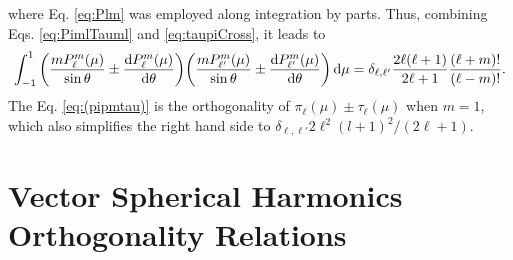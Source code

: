 %
where Eq. \eqref{eq:Plm} was employed along integration by parts. Thus, combining Eqs. \eqref{eq:PimlTauml} and \eqref{eq:taupiCross}, it leads to
%
\begin{align}
\int_{-1}^{1}\qty(\frac{mP_\ell^m(\mu)}{\sin\theta}\pm\dv{P_\ell^m(\mu)}{\theta})\qty(\frac{mP_{\ell'}^m(\mu)}{\sin\theta}\pm\dv{P_{\ell'}^m(\mu)}{\theta})\dd{\mu}
 =  \delta_{\ell,\ell'}\frac{2\ell(\ell+1)}{2\ell+1}\frac{(\ell+m)!}{(\ell-m)!}.
 \label{eq:(pipmtau)}
\end{align}
%
The Eq. \eqref{eq:(pipmtau)}  is the orthogonality of $\pi_\ell(\mu)\pm\tau_\ell(\mu)$ when $m = 1$, which also simplifies the right hand side to $\delta_{\ell,\ell'} 2\ell^2(l+1)^2/(2\ell+1)$.


\section*{Vector Spherical Harmonics Orthogonality Relations}

